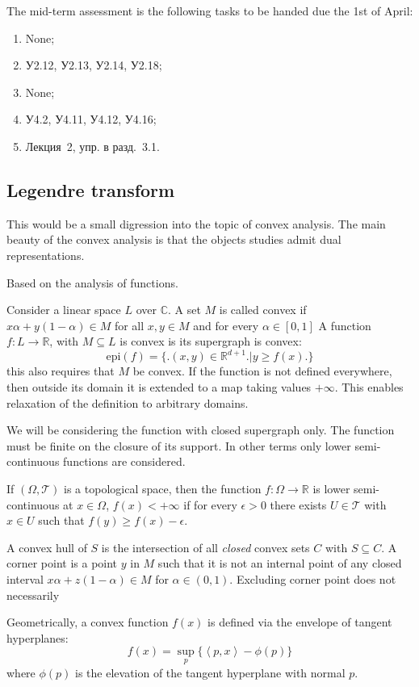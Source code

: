 \documentclass[a4paper]{article}
\newcommand{\brkt}[1]{{\left\langle #1 \right\rangle}}
\newcommand{\Real}{\mathbb{R}}
\newcommand{\Cplx}{\mathbb{C}}
\newcommand{\Tcal}{\mathcal{T}}
\newcommand{\rus}[1]{\foreignlanguage{russian}{#1}}
\begin{document}
The mid-term assessment is the following tasks to be handed due the 1st of April:
\begin{enumerate}
	\item None;
	\item \rus{У2.12, У2.13, У2.14, У2.18};
	\item None;
	\item \rus{У4.2, У4.11, У4.12, У4.16};
	\item \rus{Лекция~2, упр. в разд.~3.1}.
\end{enumerate}

\subsection{Legendre transform} %
\label{sub:legendre_transform}

This would be a small digression into the topic of convex analysis. The main beauty of the
convex analysis is that the objects studies admit dual representations.

Based on the analysis of functions.

Consider a linear space $L$ over $\Cplx$. A set $M$ is called convex if $x\alpha + y (1-\alpha)\in M$ for all $x,y\in M$ and for every $\alpha\in [0,1]$
A function $f: L\to \Real$, with $M\subseteq L$ is convex is its supergraph is convex:
\[\text{epi}(f) = \big\{\big. (x,y)\in \Real^{d+1} \big.\big\lvert y\geq f(x)\big.\big\}\]
this also requires that $M$ be convex.
If the function is not defined everywhere, then outside its domain it is extended to a map taking values $+\infty$.
This enables relaxation of the definition to arbitrary domains.

We will be considering the function with closed supergraph only. The function must be finite on the closure of its support.
In other terms only lower semi-continuous functions are considered.

If $(\Omega,\Tcal)$ is a topological space, then the function $f:\Omega\to\Real$ is lower semi-continuous at
$x\in \Omega$, $f(x)<+\infty$ if for every $\epsilon>0$ there exists $U\in \Tcal$ with $x\in U$ such that $f(y)\geq f(x)-\epsilon$.

A convex hull of $S$ is the intersection of all \emph{closed} convex sets $C$ with $S\subseteq C$. A corner point is a point $y$ in $M$ such that it is not an internal point of any closed interval $x\alpha + z(1-\alpha)\in M$ for $\alpha\in(0,1)$. Excluding corner point does not necessarily 

Geometrically, a convex function $f(x)$ is defined via the envelope of tangent hyperplanes:
\[f(x) = \sup_p \big\{ \brkt{p,x} - \phi(p) \big\}\]
where $\phi(p)$ is the elevation of the tangent hyperplane with normal $p$.
\end{document}
